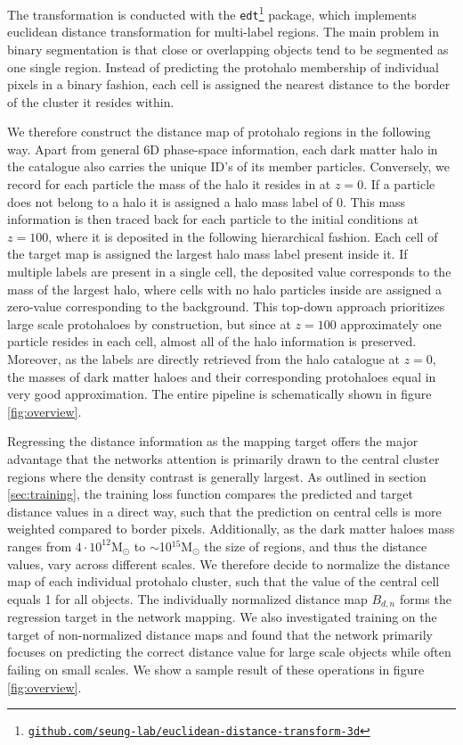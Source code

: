 \documentclass[fleqn,usenatbib]{mnras}
\newcommand{\Msun}{\text{M}_{\odot}}	%
\begin{document}
The transformation is conducted with the \texttt{edt}\footnote{\href{https://github.com/seung-lab/euclidean-distance-transform-3d}{\texttt{github.com/seung-lab/euclidean-distance-transform-3d}}} package, which implements euclidean distance transformation for multi-label regions.
The main problem in binary segmentation is that close or overlapping objects tend to be segmented as one single region.
Instead of predicting the protohalo membership of individual pixels in a binary fashion, each cell is assigned the nearest distance to the border of the cluster it resides within.\par
We therefore construct the distance map of protohalo regions in the following way. Apart from general 6D phase-space information, each dark matter halo in the catalogue also carries the unique ID's of its member particles. Conversely, we record for each particle the mass of the halo it resides in at $z=0$. If a particle does not belong to a halo it is assigned a halo mass label of 0.
This mass information is then traced back for each particle to the initial conditions at $z=100$, where it is deposited in the following hierarchical fashion. Each cell of the target map is assigned the largest halo mass label present inside it. If multiple labels are present in a single cell, the deposited value corresponds to the mass of the largest halo, where cells with no halo particles inside are assigned a zero-value corresponding to the background. This top-down approach prioritizes large scale protohaloes by construction, but since at $z=100$ approximately one particle resides in each cell, almost all of the halo information is preserved. Moreover, as the labels are directly retrieved from the halo catalogue at $z=0$, the masses of dark matter haloes and their corresponding protohaloes equal in very good approximation.
The entire pipeline is schematically shown in figure \ref{fig:overview}.\par
Regressing the distance information as the mapping target offers the major advantage that the networks attention is primarily drawn to the central cluster regions where the density contrast is generally largest. As outlined in section \ref{sec:training}, the training loss function compares the predicted and target distance values in a direct way, such that the prediction on central cells is more weighted compared to border pixels. Additionally, as the dark matter haloes mass ranges from $4\cdot 10^{12}\Msun$ to $\sim$10$^{15}\Msun$ the size of regions, and thus the distance values, vary across different scales. We therefore decide to normalize the distance map of each individual protohalo cluster, such that the value of the central cell equals 1 for all objects. The individually normalized distance map $B_{d,n}$ forms the regression target in the network mapping. We also investigated training on the target of non-normalized distance maps and found that the network primarily focuses on predicting the correct distance value for large scale objects while often failing on small scales. We show a sample result of these operations in figure \ref{fig:overview}.
\end{document}
